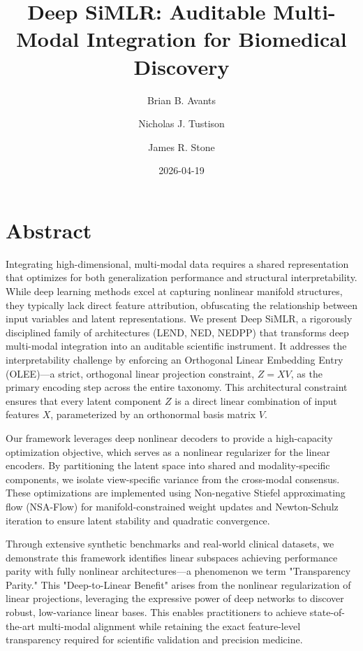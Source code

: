 \documentclass[
  letterpaper,
]{report}
\title{Deep SiMLR: Auditable Multi-Modal Integration for Biomedical
Discovery}
\author{Brian B. Avants \and Nicholas J. Tustison \and James R. Stone}
\date{2026-04-19}
\renewcommand*\contentsname{Table of contents}
\newcommand\contentsname{Table of contents}
\begin{document}
\maketitle

\renewcommand*\contentsname{Table of contents}
{
\setcounter{tocdepth}{2}
\tableofcontents
}


\chapter*{Abstract}\label{abstract}


Integrating high-dimensional, multi-modal data requires a shared
representation that optimizes for both generalization performance and
structural interpretability. While deep learning methods excel at
capturing nonlinear manifold structures, they typically lack direct
feature attribution, obfuscating the relationship between input
variables and latent representations. We present Deep SiMLR, a
rigorously disciplined family of architectures (LEND, NED, NEDPP) that
transforms deep multi-modal integration into an auditable scientific
instrument. It addresses the interpretability challenge by enforcing an
Orthogonal Linear Embedding Entry (OLEE)---a strict, orthogonal linear
projection constraint, \(Z = XV\), as the primary encoding step across
the entire taxonomy. This architectural constraint ensures that every
latent component \(Z\) is a direct linear combination of input features
\(X\), parameterized by an orthonormal basis matrix \(V\).

Our framework leverages deep nonlinear decoders to provide a
high-capacity optimization objective, which serves as a nonlinear
regularizer for the linear encoders. By partitioning the latent space
into shared and modality-specific components, we isolate view-specific
variance from the cross-modal consensus. These optimizations are
implemented using Non-negative Stiefel approximating flow (NSA-Flow) for
manifold-constrained weight updates and Newton-Schulz iteration to
ensure latent stability and quadratic convergence.

Through extensive synthetic benchmarks and real-world clinical datasets,
we demonstrate this framework identifies linear subspaces achieving
performance parity with fully nonlinear architectures---a phenomenon we
term "Transparency Parity." This "Deep-to-Linear Benefit" arises from
the nonlinear regularization of linear projections, leveraging the
expressive power of deep networks to discover robust, low-variance
linear bases. This enables practitioners to achieve state-of-the-art
multi-modal alignment while retaining the exact feature-level
transparency required for scientific validation and precision medicine.
\end{document}
